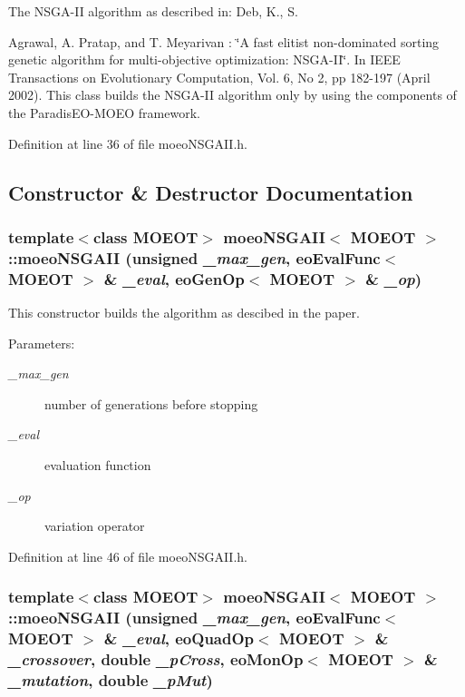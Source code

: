 The NSGA-II algorithm as described in: Deb, K., S. 

Agrawal, A. Pratap, and T. Meyarivan : \char`\"{}A fast elitist non-dominated sorting genetic algorithm for multi-objective optimization: NSGA-II\char`\"{}. In IEEE Transactions on Evolutionary Computation, Vol. 6, No 2, pp 182-197 (April 2002). This class builds the NSGA-II algorithm only by using the components of the Paradis\-EO-MOEO framework. 



Definition at line 36 of file moeo\-NSGAII.h.

\subsection{Constructor \& Destructor Documentation}
\subsubsection{\setlength{\rightskip}{0pt plus 5cm}template$<$class MOEOT$>$ {\bf moeo\-NSGAII}$<$ MOEOT $>$::{\bf moeo\-NSGAII} (unsigned {\em \_\-max\_\-gen}, {\bf eo\-Eval\-Func}$<$ MOEOT $>$ \& {\em \_\-eval}, {\bf eo\-Gen\-Op}$<$ MOEOT $>$ \& {\em \_\-op})\hspace{0.3cm}{\tt  [inline]}}\label{classmoeoNSGAII_c080a3ce03bfa2a91685e2cf2f0ee75a}


This constructor builds the algorithm as descibed in the paper. 

\begin{Desc}
\item[Parameters:]
\begin{description}
\item[{\em \_\-max\_\-gen}]number of generations before stopping \item[{\em \_\-eval}]evaluation function \item[{\em \_\-op}]variation operator \end{description}
\end{Desc}


Definition at line 46 of file moeo\-NSGAII.h.
\subsubsection{\setlength{\rightskip}{0pt plus 5cm}template$<$class MOEOT$>$ {\bf moeo\-NSGAII}$<$ MOEOT $>$::{\bf moeo\-NSGAII} (unsigned {\em \_\-max\_\-gen}, {\bf eo\-Eval\-Func}$<$ MOEOT $>$ \& {\em \_\-eval}, {\bf eo\-Quad\-Op}$<$ MOEOT $>$ \& {\em \_\-crossover}, double {\em \_\-p\-Cross}, {\bf eo\-Mon\-Op}$<$ MOEOT $>$ \& {\em \_\-mutation}, double {\em \_\-p\-Mut})\hspace{0.3cm}{\tt  [inline]}}\label{classmoeoNSGAII_3a5800c46a4c66bd2de7111d7cad885b}


